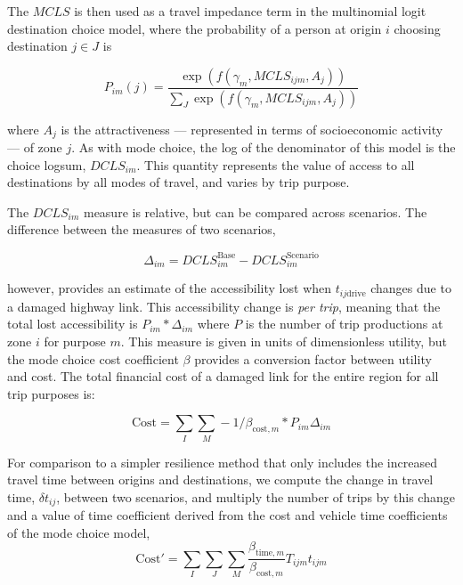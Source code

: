 The \(MCLS\) is then used as a travel impedance term in the multinomial
logit
destination choice model, where the probability of a person at origin \(i\)
choosing destination \(j \in J\) is

\begin{equation}
{P}_{im}(j) = \frac{\exp(f(\gamma_{m}, MCLS_{ijm},
A_j))}{\sum_{J}\exp(f(\gamma_{m}, MCLS_{ijm}, A_j))}
  \label{eq:dcp}
\end{equation}

\noindent where \(A_j\) is the attractiveness --- represented in terms of
socioeconomic activity --- of zone \(j\). As with mode choice, the log of the
denominator of this model is the
choice logsum, \(DCLS_{im}\). This quantity represents the value of access to
all destinations
by all modes of travel, and varies by trip purpose.

The \(DCLS_{im}\) measure is relative, but can be compared across
scenarios. The difference between the measures of two scenarios,

\begin{equation}
\Delta_{im} = DCLS_{im}^{\mathrm{Base}} - DCLS_{im}^{\mathrm{Scenario}}
  \label{eq:deltas}
\end{equation}

 \noindent however, provides an estimate of the accessibility lost when
 \(t_{ij\mathrm{drive}}\)
changes due to a damaged highway link. This accessibility change is \emph{per
trip},
meaning that the total lost accessibility is \(P_{im} * \Delta_{im}\) where
\(P\) is
the number of trip productions at zone \(i\) for purpose \(m\). This measure is
given in units of dimensionless utility, but the mode choice cost coefficient
\(\beta\) provides a conversion factor between utility and cost. The total
financial
cost of a damaged link for the entire region for all trip purposes is:

\begin{equation}
\mathrm{Cost} = \sum_{I}\sum_{M} -1 / \beta_{\mathrm{cost},m} * P_{im}
\Delta_{im}
  \label{eq:totalcost}
\end{equation}

For comparison to a simpler resilience method that only includes the increased
travel time between origins and destinations, we compute the change in travel
time, \(\delta t_{ij}\), between two scenarios, and multiply the number of trips by this change
and a value of time coefficient derived from the cost and vehicle time
coefficients
of the mode choice model,
\begin{equation}
\mathrm{Cost}' =  \sum_I \sum_J \sum_M \frac{\beta_{\mathrm{time}, m}
}{\beta_{\mathrm{cost}, m}} T_{ijm} t_{ijm}
  \label{eq:ttmethod}
\end{equation}

